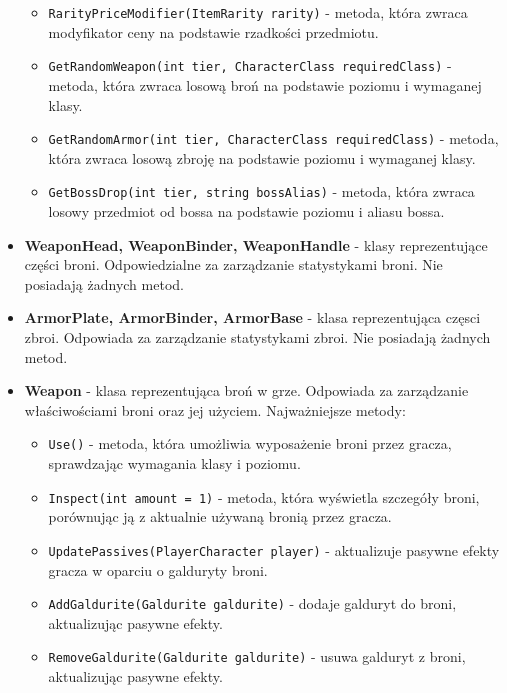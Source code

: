 \begin{itemize}
                \begin{itemize}
                    \item \texttt{RarityPriceModifier(ItemRarity rarity)} - metoda, która zwraca modyfikator ceny na podstawie rzadkości przedmiotu.
                    \item \texttt{GetRandomWeapon(int tier, CharacterClass requiredClass)} - metoda, która zwraca losową broń na podstawie poziomu i wymaganej klasy.
                    \item \texttt{GetRandomArmor(int tier, CharacterClass requiredClass)} - metoda, która zwraca losową zbroję na podstawie poziomu i wymaganej klasy.
                    \item \texttt{GetBossDrop(int tier, string bossAlias)} - metoda, która zwraca losowy przedmiot od bossa na podstawie poziomu i aliasu bossa.
                \end{itemize}
            \item \textbf{WeaponHead, WeaponBinder, WeaponHandle} - klasy reprezentujące części broni. 
            Odpowiedzialne za zarządzanie statystykami broni. Nie posiadają żadnych metod.
            \item \textbf{ArmorPlate, ArmorBinder, ArmorBase} - klasa reprezentująca częsci zbroi. 
            Odpowiada za zarządzanie statystykami zbroi. Nie posiadają żadnych metod.
            \item \textbf{Weapon} - klasa reprezentująca broń w grze. Odpowiada za zarządzanie właściwościami broni oraz jej użyciem. Najważniejsze metody:
                \begin{itemize}
                    \item \texttt{Use()} - metoda, która umożliwia wyposażenie broni przez gracza, sprawdzając wymagania klasy i poziomu.
                    \item \texttt{Inspect(int amount = 1)} - metoda, która wyświetla szczegóły broni, porównując ją z aktualnie używaną bronią przez gracza.
                    \item \texttt{UpdatePassives(PlayerCharacter player)} - aktualizuje pasywne efekty gracza w oparciu o galduryty broni.
                    \item \texttt{AddGaldurite(Galdurite galdurite)} - dodaje galduryt do broni, aktualizując pasywne efekty.
                    \item \texttt{RemoveGaldurite(Galdurite galdurite)} - usuwa galduryt z broni, aktualizując pasywne efekty.
                \end{itemize}

\end{itemize}
